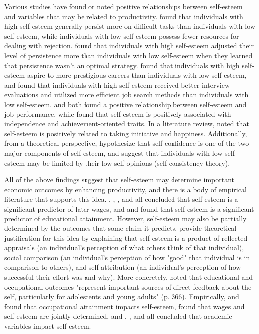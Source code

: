 \documentclass[12pt]{report}
\newcommand{\citee}[1]{\citename{#1} \citeyear{#1}}
\begin{document}
Various studies have found or noted positive relationships between self-esteem and variables that may be related to productivity. \citee{SB2002} found that individuals with high self-esteem generally persist more on difficult tasks than individuals with low self-esteem, while individuals with low self-esteem possess fewer resources for dealing with rejection. \citee{SBG1988} found that individuals with high self-esteem adjusted their level of persistence more than individuals with low self-esteem when they learned that persistence wasn't an optimal strategy.  \citee{B1977} found that individuals with high self-esteem aspire to more prestigious careers than individuals with low self-esteem,  and \citee{ET1983} found that individuals with high self-esteem received better interview evaluations and utilized more efficient job search methods than individuals with low self-esteem. \citee{JEB1998} and \citee{JB2001} both found a positive relationship between self-esteem and job performance, while \citee{F2005} found that self-esteem is positively associated with independence and achievement-oriented traits. In a literature review, \citee{B2003} noted that self-esteem is positively related to taking initiative and happiness. Additionally, from a theoretical perspective, \citee{TS2001} hypothesize that self-confidence is one of the two major components of self-esteem, and \citee{RSS1989} suggest that individuals with low self-esteem may be limited by their low self-opinions (self-consistency theory).

All of the above findings suggest that self-esteem may determine important economic outcomes by enhancing productivity, and there is a body of empirical literature that supports this idea. \citee{W1999}, \citee{F2000}, \citee{M2001}, and \citee{W2006} all concluded that self-esteem is a significant predictor of later wages, and  \citee{W1999} and \citee{W2006} found that self-esteem is a significant predictor of educational attainment. However, self-esteem may also be partially determined by the outcomes that some claim it predicts. \citee{RSS1989} provide theoretical justification for this idea by explaining that self-esteem is a product of reflected appraisals (an individual's perception of what others think of that individual), social comparison (an individual's perception of how "good" that individual is in comparison to others), and self-attribution (an individual's perception of how successful their effort was and why). More concretely, \citee{BO1977} noted that educational and occupational outcomes "represent important sources of direct feedback about the self, particularly for adolescents and young adults" (p. 366). Empirically, \citee{BO1977} and \citee{GVD1996} found that occupational attainment impacts self-esteem, \citee{GVD1997} found that wages and self-esteem are jointly determined, and \citee{RSS1989}, \citee{F1998}, and \citee{RB2000} all concluded that academic variables impact self-esteem.
\end{document}
